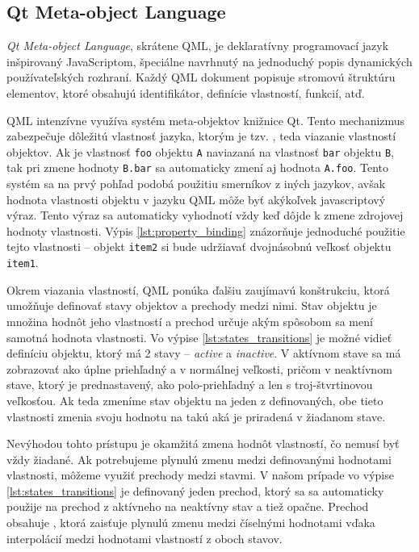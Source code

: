 \subsection{Qt Meta-object Language}

\textit{Qt Meta-object Language}, skrátene QML, je deklaratívny programovací jazyk inšpirovaný JavaScriptom, špeciálne navrhnutý na jednoduchý popis dynamických používateľských rozhraní. Každý QML dokument popisuje stromovú štruktúru elementov, ktoré obsahujú identifikátor, definície vlastností, funkcií, atď.

QML intenzívne využíva systém meta-objektov knižnice Qt. Tento mechanizmus zabezpečuje dôležitú vlastnosť jazyka, ktorým je tzv. , teda viazanie vlastností objektov. Ak je vlastnosť \texttt{foo} objektu \texttt{A} naviazaná na vlastnosť \texttt{bar} objektu \texttt{B}, tak pri zmene hodnoty \texttt{B.bar} sa automaticky zmení aj hodnota \texttt{A.foo}. Tento systém sa na prvý pohľad podobá použitiu smerníkov z iných jazykov, avšak hodnota vlastnosti objektu v jazyku QML môže byť akýkoľvek javascriptový výraz. Tento výraz sa automaticky vyhodnotí vždy keď dôjde k zmene zdrojovej hodnoty vlastnosti. Výpis \ref{lst:property_binding} znázorňuje jednoduché použitie tejto vlastnosti -- objekt \texttt{item2} si bude udržiavať dvojnásobnú veľkosť objektu \texttt{item1}.



Okrem viazania vlastností, QML ponúka ďalšiu zaujímavú konštrukciu, ktorá umožňuje definovať stavy objektov a prechody medzi nimi. Stav objektu je množina hodnôt jeho vlastností a prechod určuje akým spôsobom sa mení samotná hodnota vlastnosti. Vo výpise \ref{lst:states_transitions} je možné vidieť definíciu objektu, ktorý má 2 stavy -- \textit{active} a \textit{inactive}. V aktívnom stave sa má zobrazovať ako úplne priehľadný a v normálnej veľkosti, pričom v neaktívnom stave, ktorý je prednastavený, ako polo-priehľadný a len s troj-štvrtinovou veľkosťou. Ak teda zmeníme stav objektu na jeden z definovaných, obe tieto vlastnosti zmenia svoju hodnotu na takú aká je priradená v žiadanom stave.

Nevýhodou tohto prístupu je okamžitá zmena hodnôt vlastností, čo nemusí byť vždy žiadané. Ak potrebujeme plynulú zmenu medzi definovanými hodnotami vlastnosti, môžeme využiť prechody medzi stavmi. V našom prípade vo výpise \ref{lst:states_transitions} je definovaný jeden prechod, ktorý sa sa automaticky použije na prechod z aktívneho na neaktívny stav a tiež opačne. Prechod obsahuje , ktorá zaisťuje plynulú zmenu medzi číselnými hodnotami vďaka interpolácií medzi hodnotami vlastností z oboch stavov.

